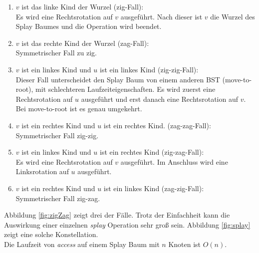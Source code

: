 \documentclass[a4paper,12pt]{article}
\begin{document}
\begin{enumerate}
	\item $v$ ist das linke Kind der Wurzel (zig-Fall):\\
	Es wird eine Rechtsrotation auf $v$ ausgeführt. Nach dieser ist $v$ die Wurzel des Splay Baumes und die Operation wird beendet. 
	\item $v$ ist das rechte Kind der Wurzel (zag-Fall):\\
	Symmetrischer Fall zu zig.
	\item $v$ ist ein linkes Kind und $u$ ist ein linkes Kind (zig-zig-Fall):\\
	Dieser Fall unterscheidet den Splay Baum von einem anderen BST (move-to-root), mit schlechteren Laufzeiteigenschaften. Es wird zuerst eine Rechtsrotation auf $u$ ausgeführt und erst danach eine Rechtsrotation auf $v$. Bei move-to-root  ist es genau umgekehrt. 
	\item $v$ ist ein rechtes Kind und $u$ ist ein rechtes Kind. (zag-zag-Fall):\\
	Symmetrischer Fall zig-zig.
	\item $v$ ist ein linkes Kind und $u$ ist ein rechtes Kind (zig-zag-Fall):\\
	Es wird eine Rechtsrotation auf $v$ ausgeführt. Im Anschluss wird eine Linksrotation auf $u$ ausgeführt.
	\item $v$ ist ein rechtes Kind und $u$ ist ein linkes Kind (zag-zig-Fall):\\
	Symmetrischer Fall zig-zag.
	
\end{enumerate}
Abbildung  \ref{fig:zigZag} zeigt drei der Fälle. Trotz der Einfachheit kann die Auswirkung einer einzelnen \textit{splay} Operation sehr groß sein. Abbildung \ref{fig:splay} \cite{splay} zeigt eine solche Konstellation. \\
Die Laufzeit von \textit{access} auf einem Splay Baum mit $n$ Knoten ist $O\left(n\right)$.
\end{document}
